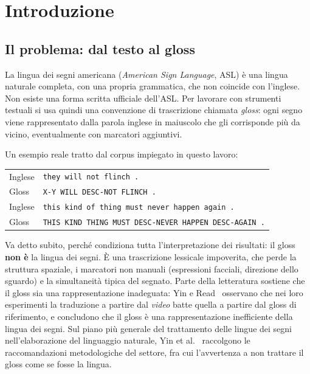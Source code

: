 \chapter{Introduzione}
\label{cap:introduzione}

\section{Il problema: dal testo al gloss}

La lingua dei segni americana (\emph{American Sign Language}, ASL) è una lingua
naturale completa, con una propria grammatica, che non coincide con l'inglese.
Non esiste una forma scritta ufficiale dell'ASL. Per lavorare con strumenti
testuali si usa quindi una convenzione di trascrizione chiamata \emph{gloss}:
ogni segno viene rappresentato dalla parola inglese in maiuscolo che gli
corrisponde più da vicino, eventualmente con marcatori aggiuntivi.

Un esempio reale tratto dal corpus impiegato in questo lavoro:

\begin{center}
\begin{tabular}{ll}
\toprule
Inglese & \texttt{they will not flinch .} \\
Gloss   & \texttt{X-Y WILL DESC-NOT FLINCH .} \\
\midrule
Inglese & \texttt{this kind of thing must never happen again .} \\
Gloss   & \texttt{THIS KIND THING MUST DESC-NEVER HAPPEN DESC-AGAIN .} \\
\bottomrule
\end{tabular}
\end{center}

Va detto subito, perché condiziona tutta l'interpretazione dei risultati: il
gloss \textbf{non è} la lingua dei segni. È una trascrizione lessicale
impoverita, che perde la struttura spaziale, i marcatori non manuali (espressioni
facciali, direzione dello sguardo) e la simultaneità tipica del segnato. Parte
della letteratura sostiene che il gloss sia una rappresentazione
inadeguata: Yin e Read~\cite{yinread2020stmc} osservano che nei loro esperimenti
la traduzione a partire dal \emph{video} batte quella a partire dal gloss di
riferimento, e concludono che il gloss è una rappresentazione inefficiente della
lingua dei segni. Sul piano più generale del trattamento delle lingue dei segni
nell'elaborazione del linguaggio naturale, Yin et
al.~\cite{yin2021including} raccolgono le raccomandazioni metodologiche del
settore, fra cui l'avvertenza a non trattare il gloss come se fosse la lingua.

